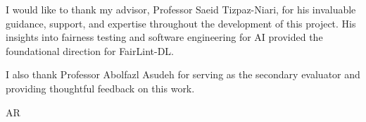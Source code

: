 I would like to thank my advisor, Professor Saeid Tizpaz-Niari, for his invaluable guidance, support, and expertise throughout the development of this project. His insights into fairness testing and software engineering for AI provided the foundational direction for FairLint-DL.

I also thank Professor Abolfazl Asudeh for serving as the secondary evaluator and providing thoughtful feedback on this work.

\vspace{60pt}
\hfill AR
